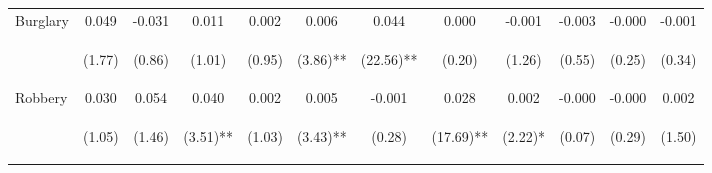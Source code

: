\begin{tabular}{lccccccccccc}
\noalign{\smallskip}Burglary & 0.049 & -0.031 & 0.011 & 0.002 & 0.006 & 0.044 & 0.000 & -0.001 & -0.003 & -0.000 & -0.001\\
 & \begin{footnotesize}(1.77)\end{footnotesize} & \begin{footnotesize}(0.86)\end{footnotesize} & \begin{footnotesize}(1.01)\end{footnotesize} & \begin{footnotesize}(0.95)\end{footnotesize} & \begin{footnotesize}(3.86)**\end{footnotesize} & \begin{footnotesize}(22.56)**\end{footnotesize} & \begin{footnotesize}(0.20)\end{footnotesize} & \begin{footnotesize}(1.26)\end{footnotesize} & \begin{footnotesize}(0.55)\end{footnotesize} & \begin{footnotesize}(0.25)\end{footnotesize} & \begin{footnotesize}(0.34)\end{footnotesize}\\
\noalign{\smallskip}Robbery & 0.030 & 0.054 & 0.040 & 0.002 & 0.005 & -0.001 & 0.028 & 0.002 & -0.000 & -0.000 & 0.002\\
 & \begin{footnotesize}(1.05)\end{footnotesize} & \begin{footnotesize}(1.46)\end{footnotesize} & \begin{footnotesize}(3.51)**\end{footnotesize} & \begin{footnotesize}(1.03)\end{footnotesize} & \begin{footnotesize}(3.43)**\end{footnotesize} & \begin{footnotesize}(0.28)\end{footnotesize} & \begin{footnotesize}(17.69)**\end{footnotesize} & \begin{footnotesize}(2.22)*\end{footnotesize} & \begin{footnotesize}(0.07)\end{footnotesize} & \begin{footnotesize}(0.29)\end{footnotesize} & \begin{footnotesize}(1.50)\end{footnotesize}\\

\end{tabular}
